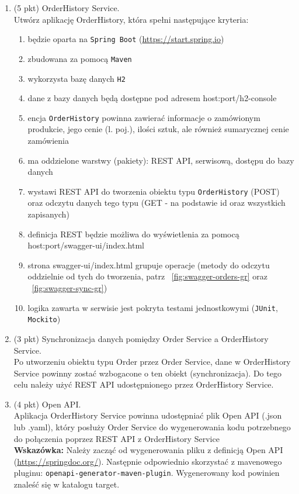 \documentclass[12pt]{article}
\begin{document}
\begin{enumerate}
        \item\label{exc:order_history_service}
            (5 pkt) OrderHistory Service.\\
            Utwórz aplikację OrderHistory, która spełni następujące kryteria:
            \begin{enumerate}
                \item będzie oparta na \texttt{Spring Boot} (\url{https://start.spring.io})
                \item zbudowana za pomocą \texttt{Maven}
                \item wykorzysta bazę danych \texttt{H2} 
                \item dane z bazy danych będą dostępne pod adresem host:port/h2-console 
                \item encja \texttt{OrderHistory} powinna zawierać informacje o zamówionym produkcie, jego cenie (l. poj.), ilości sztuk, ale również sumarycznej cenie zamówienia
                \item ma oddzielone warstwy (pakiety): REST API, serwisową, dostępu do bazy danych
                \item wystawi REST API do tworzenia obiektu typu \texttt{OrderHistory} (POST) oraz odczytu danych tego typu (GET - na podstawie id oraz wszystkich zapisanych)
                \item definicja REST będzie możliwa do wyświetlenia za pomocą host:port/swagger-ui/index.html
                \item strona swagger-ui/index.html grupuje operacje (metody do odczytu oddzielnie od tych do tworzenia, patrz ~\ref{fig:swagger-orders-gr} oraz ~\ref{fig:swagger-sync-gr})
                \item logika zawarta w serwisie jest pokryta testami jednostkowymi (\texttt{JUnit}, \texttt{Mockito})
            \end{enumerate}  

        \item\label{exc:cqrs_sync}
            (3 pkt) Synchronizacja danych pomiędzy Order Service a OrderHistory Service.\\
            Po utworzeniu obiektu typu Order przez Order Service, dane w OrderHistory Service powinny zostać wzbogacone o ten obiekt (synchronizacja). 
Do tego celu należy użyć REST API udostępnionego przez OrderHistory Service.

        \item\label{exc:openapi}
            (4 pkt) Open API.\\
            Aplikacja OrderHistory Service powinna udostępniać plik Open API (.json lub .yaml), który posłuży Order Service do wygenerowania kodu potrzebnego do połączenia poprzez REST API z OrderHistory Service\\
            \textbf{Wskazówka:} Należy zacząć od wygenerowania pliku z definicją Open API (\url{https://springdoc.org/}). Następnie odpowiednio skorzystać z mavenowego pluginu: \texttt{openapi-generator-maven-plugin}. Wygenerowany kod powinien znaleść się w katalogu target.
    \end{enumerate}
\end{document}
